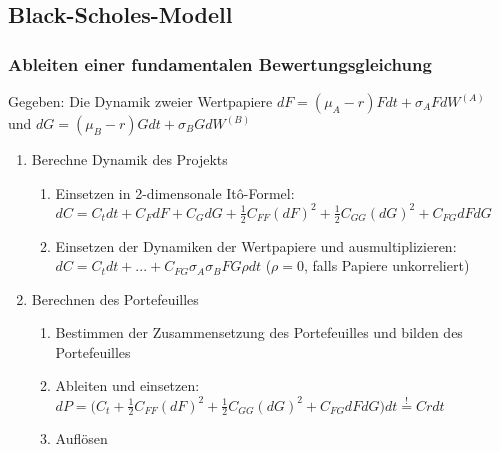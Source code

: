 \subsection{Black-Scholes-Modell}

\subsubsection{Ableiten einer fundamentalen Bewertungsgleichung}
Gegeben: Die Dynamik zweier Wertpapiere \(dF = (\mu_A-r)Fdt+\sigma_AFdW^{(A)}\) und \(dG = (\mu_B-r)Gdt+\sigma_BGdW^{(B)}\)
\begin{enumerate}
	\item Berechne Dynamik des Projekts
	\begin{enumerate}
		\item Einsetzen in 2-dimensonale Itô-Formel: \(dC = C_tdt + C_FdF + C_GdG + \frac{1}{2}C_{FF}(dF)^2 + \frac{1}{2}C_{GG}(dG)^2 + C_{FG}dFdG\)
		\item Einsetzen der Dynamiken der Wertpapiere und ausmultiplizieren: \(dC = C_tdt + ... + C_{FG}\sigma_A\sigma_BFG\rho dt\) (\(\rho=0\), falls Papiere unkorreliert)
	\end{enumerate}
	\item Berechnen des Portefeuilles
	\begin{enumerate}
		\item Bestimmen der Zusammensetzung des Portefeuilles und bilden des Portefeuilles
		\item Ableiten und einsetzen: \(dP = \Big(C_t + \frac{1}{2}C_{FF}(dF)^2 + \frac{1}{2}C_{GG}(dG)^2 + C_{FG}dFdG\Big)dt \stackrel{!}{=} Crdt\)
		\item Auflösen
	\end{enumerate}
\end{enumerate}
